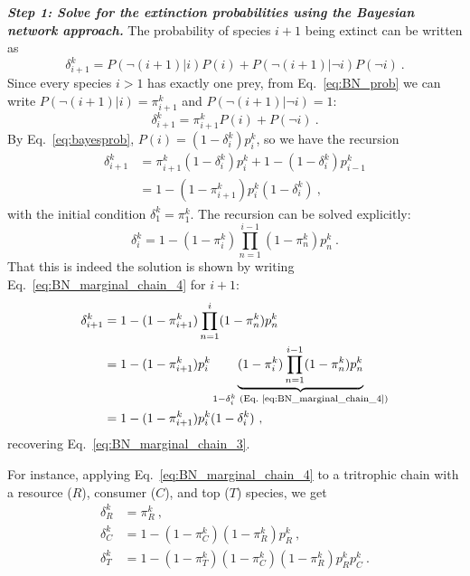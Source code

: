 \documentclass[11pt]{article}
\begin{document}
\textit{\textbf{Step 1: Solve for the extinction probabilities using the Bayesian network approach.}}
The probability of species $i+1$ being extinct can be written as
\begin{equation}
  \label{eq:BN_marginal_chain}
  \delta_{i+1}^k = P(\neg (i+1)|i) P(i) + P(\neg (i+1)|\neg i) P(\neg i) \ .
\end{equation}
Since every species $i>1$ has exactly one prey, from Eq.~\ref{eq:BN_prob} we can write $P(\neg (i+1)|i) = \pi_{i+1}^k$ and $P(\neg (i+1)|\neg i) = 1$:
\begin{equation}
  \label{eq:BN_marginal_chain_2}
  \delta_{i+1}^k = \pi_{i+1}^k P(i) + P(\neg i) \ .
\end{equation}
By Eq.~\ref{eq:bayesprob}, $P(i) = (1-\delta_i^k)p_i^k$, so we have the recursion
\begin{equation}
  \label{eq:BN_marginal_chain_3}
  \begin{split}
    \delta_{i+1}^k &= \pi_{i+1}^k (1-\delta_i^k)p_i^k + 1 - (1 - \delta_i^k)
    p_{i-1}^k \\ &= 1 - (1-\pi_{i+1}^k) p_i^k (1 - \delta_i^k) \ ,
  \end{split}
\end{equation}
with the initial condition $\delta_1^k = \pi_1^k$. The recursion can be solved explicitly:
\begin{equation}
  \label{eq:BN_marginal_chain_4}
  \delta_i^k = 1 - (1 - \pi_i^k) \prod_{n=1}^{i-1} (1 - \pi_n^k) p_n^k \ .
\end{equation}
That this is indeed the solution is shown by writing Eq.~\ref{eq:BN_marginal_chain_4} for $i+1$:
\begin{equation}
  \label{eq:BN_marginal_chain_5}
  \begin{split}
    \delta_{i+1}^k &= 1 - (1 - \pi_{i+1}^k) \prod_{n=1}^{i} (1 - \pi_n^k) p_n^k
    \\ &= 1 - (1 - \pi_{i+1}^k) p_i^k \underbrace{(1 - \pi_i^k) \prod_{n=1}^{i-1}
      (1 - \pi_n^k) p_n^k}_{1 - \delta_i^k
      \text{ (Eq.~\ref{eq:BN_marginal_chain_4})}} \\ &=
    1 - (1-\pi_{i+1}^k) p_i^k (1 - \delta_i^k) \ ,
  \end{split}
\end{equation}
recovering Eq.~\ref{eq:BN_marginal_chain_3}.

For instance, applying Eq.~\ref{eq:BN_marginal_chain_4} to a tritrophic chain with a resource ($R$), consumer ($C$), and top ($T$) species, we get
\begin{align}
  \label{eq:BN_marginal_chain_R}
  \delta_R^k &= \pi_R^k \ , \\
  \label{eq:BN_marginal_chain_C}
  \delta_C^k &= 1 - (1 - \pi_C^k) (1 - \pi_R^k) p_R^k \ , \\
  \label{eq:BN_marginal_chain_T}
  \delta_T^k &= 1 - (1 - \pi_T^k) (1 - \pi_C^k) (1 - \pi_R^k) p_R^k p_C^k \ .
\end{align}
\end{document}
